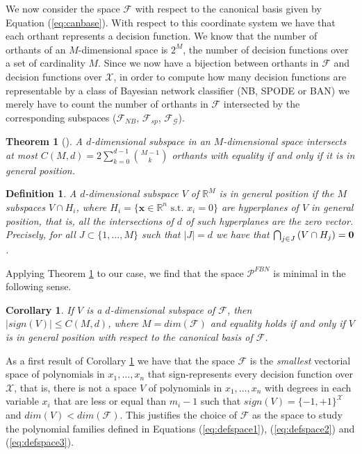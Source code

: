 \documentclass[11pt,a4paper, twoside]{book}
\newtheorem{theorem}{Theorem}[chapter]
\newtheorem{corollary}{Corollary}[chapter]
\newtheorem{definition}{Definition}[chapter]
\newcommand{\bchi}{\boldsymbol{\mathcal{X}}}
\begin{document}
We now consider the space $\mathcal{F}$ with respect to the canonical basis given by Equation (\ref{eq:canbase}). With respect to this coordinate system we have that each orthant represents a decision function. We know that the number of orthants of {an $M$-dimensional} space is $2^M$, the number of decision  functions over a set of cardinality $M$.
Since we now have a bijection between orthants in $\mathcal{F}$ and decision functions over $\bchi$, in order to compute how many decision functions are representable by a class of Bayesian network classifier (NB, SPODE or BAN) we merely have to count the number of orthants in $\mathcal{F}$ intersected by the corresponding subspaces ($ \mathcal{F}_{NB}$, $ \mathcal{F}_{sp}$, $ \mathcal{F}_{\mathcal{G}}$). 
\begin{theorem}[\citealp{Flatto1970}]A $d$-dimensional subspace in {an $M$-dimensional} space intersects at most $C(M,d)=2\sum_{k=0}^{d-1}{M-1 \choose k }$ orthants with equality if and only if it is in general position.
\label{teo:subspace}
\end{theorem}
\begin{definition}
A $d$-dimensional subspace $V$ of $\mathbb{R}^M$ is in general position if the $M$ subspaces $V \cap H_{i}$, where \mbox{$H_i=\{ \mathbf{x}\in \mathbb{R}^n\text{ s.t. } x_i=0\}$} are hyperplanes of $V$ in general position, that is, all the intersections of $d$ of such hyperplanes are the zero vector. Precisely, for all $J \subset \{ 1,\ldots,M \}$ such that $|J|=d$ we have that $\bigcap_{j \in J} \left( V \cap H_{j} \right) ={\bf 0}$.
\end{definition}
Applying Theorem \ref{teo:subspace} to our case, we find that the space $\mathcal{P}^{FBN}$ is minimal in the following sense.
\begin{corollary}
If $V$ is a $d$-dimensional subspace of $\mathcal{F}$, then $|sign(V)|\leq C(M,d)$, where $M=dim(\mathcal{F})$ and equality holds if and only if $V$ is in general position with respect to the canonical basis of $\mathcal{F}$.
\label{cor:upperbound}
\end{corollary}
As a first result of Corollary \ref{cor:upperbound} we have that the space $\mathcal{F}$ is the \textit{smallest} vectorial space of polynomials in $x_1,\ldots,x_n$ that sign-represents every decision function over $\bchi$, that is, there is not a space $V$ of polynomials in $x_1,\ldots,x_n$ with degrees in each variable $x_i$ that are less or equal than $m_i-1$ such that $sign(V)=\{-1,+1\}^{\bchi}$ and $dim(V)<dim(  \mathcal{F})$. This justifies the choice of $\mathcal{F}$ as the space to study the polynomial families defined in Equations (\ref{eq:defspace1}), (\ref{eq:defspace2}) and (\ref{eq:defspace3}).
\end{document}
